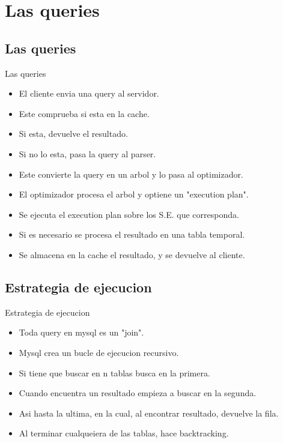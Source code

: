 \section{Las queries}

\subsection{Las queries}
\begin{frame}{Las queries}
  \begin{itemize}
    \item El cliente envia una query al servidor.
    \item Este comprueba si esta en la cache.
    \item Si esta, devuelve el resultado.
    \item Si no lo esta, pasa la query al parser.
    \item Este convierte la query en un arbol y lo pasa al optimizador.
    \item El optimizador procesa el arbol y optiene un "execution plan".
    \item Se ejecuta el execution plan sobre los S.E. que corresponda.
    \item Si es necesario se procesa el resultado en una tabla temporal.
    \item Se almacena en la cache el resultado, y se devuelve al cliente.
  \end{itemize}
\end{frame}

\subsection{Estrategia de ejecucion}
\begin{frame}{Estrategia de ejecucion}
  \begin{itemize}
    \item Toda query en mysql es un "join".
    \item Mysql crea un bucle de ejecucion recursivo.
    \item Si tiene que buscar en n tablas busca en la primera.
    \item Cuando encuentra un resultado empieza a buscar en la segunda.
    \item Asi hasta la ultima, en la cual, al encontrar resultado, devuelve la fila.
    \item Al terminar cualqueiera de las tablas, hace backtracking.
  \end{itemize}
\end{frame}

